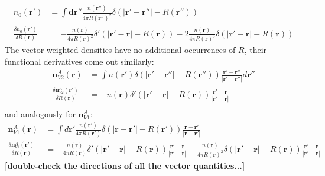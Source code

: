 \documentclass[letterpaper,twocolumn,amsmath,amssymb,jcp,10pt,aip]{revtex4-1}
\newcommand{\red}[1]{{\bf \color{red} #1}}
\newcommand{\rr}{\textbf{r}}
\newcommand{\fixme}[1]{\red{[#1]}}
\begin{document}
\begin{widetext}
\begin{align}
  n_0(\rr') &= \int \mathbf{dr''} \frac{n(\rr'')}{4\pi R(\rr'')^2}
  \delta(|\rr'-\rr''| - R(\rr'')) \\
  \frac{\delta n_0(\rr')}{\delta R(\rr)}
  &= -\frac{n(\rr)}{4\pi
    R(\rr)^2}\delta'(|\rr'-\rr| - R(\rr))
  -
  2\frac{n(\rr)}{4\pi
    R(\rr)^3}\delta(|\rr'-\rr| - R(\rr))
\end{align}
The vector-weighted densities have no additional occurrences of $R$,
their functional derivatives come out similarly:
\begin{align}
  \mathbf{n}_{V2}^{A}(\rr) &= \int n(\rr') \delta(|\rr' - \rr''| - R(\rr''))
    \frac{\rr'-\rr''}{|\rr'-\rr''|} d \rr''\\
  \frac{\delta \mathbf{n}_{V2}^{A}(\rr')}{\delta R(\rr)} &= - n(\rr) \delta'(|\rr' - \rr| - R(\rr))
    \frac{\rr'-\rr}{|\rr'-\rr|}\\
\end{align}
and analogously for $\mathbf{n}_{V1}^A$:
\begin{align}
  \mathbf{n}_{V1}^A(\rr) &= \int d\rr' \frac{n(\rr')}{4\pi R(\rr')}
  \delta(|\mathbf{r}-\rr'| - R(\rr')) \frac{\rr-\rr'}{|\rr-\rr'|}\\
  \frac{\delta \mathbf{n}_{V1}^A(\rr')}{\delta R(\rr)}
  &= -\frac{n(\rr)}{4\pi
    R(\rr)}\delta'(|\rr'-\rr| - R(\rr)) \frac{\rr'-\rr}{|\rr'-\rr|}
  -
  \frac{n(\rr)}{4\pi
    R(\rr)^2}\delta(|\rr'-\rr| - R(\rr)) \frac{\rr'-\rr}{|\rr'-\rr|}
\end{align}
\fixme{double-check the directions of all the vector quantities...}


\end{widetext}
\end{document}

